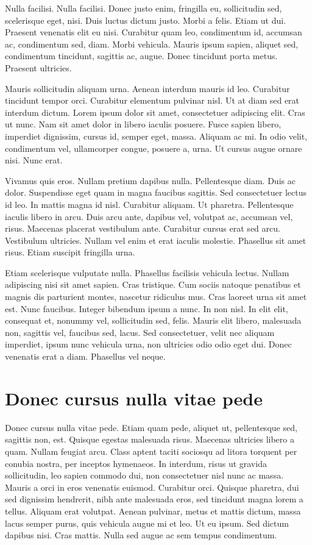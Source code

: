 \documentclass[printmode,mgr,pl]{mgr}
\begin{document}
Nulla facilisi. Nulla facilisi. Donec justo enim, fringilla eu,
sollicitudin sed, scelerisque eget, nisi. Duis luctus dictum
justo. Morbi a felis. Etiam ut dui. Praesent venenatis elit eu
nisi. Curabitur quam leo, condimentum id, accumsan ac, condimentum
sed, diam. Morbi vehicula. Mauris ipsum sapien, aliquet sed,
condimentum tincidunt, sagittis ac, augue. Donec tincidunt porta
metus. Praesent ultricies.

Mauris sollicitudin aliquam urna. Aenean interdum mauris id
leo. Curabitur tincidunt tempor orci. Curabitur elementum pulvinar
nisl. Ut at diam sed erat interdum dictum. Lorem ipsum dolor sit amet,
consectetuer adipiscing elit. Cras ut nunc. Nam sit amet dolor in
libero iaculis posuere. Fusce sapien libero, imperdiet dignissim,
cursus id, semper eget, massa. Aliquam ac mi. In odio velit,
condimentum vel, ullamcorper congue, posuere a, urna. Ut cursus augue
ornare nisi. Nunc erat.

Vivamus quis eros. Nullam pretium dapibus nulla. Pellentesque
diam. Duis ac dolor. Suspendisse eget quam in magna faucibus
sagittis. Sed consectetuer lectus id leo. In mattis magna id
nisl. Curabitur aliquam. Ut pharetra. Pellentesque iaculis libero in
arcu. Duis arcu ante, dapibus vel, volutpat ac, accumsan vel,
risus. Maecenas placerat vestibulum ante. Curabitur cursus erat sed
arcu. Vestibulum ultricies. Nullam vel enim et erat iaculis
molestie. Phasellus sit amet risus. Etiam suscipit fringilla urna.

Etiam scelerisque vulputate nulla. Phasellus facilisis vehicula
lectus. Nullam adipiscing nisi sit amet sapien. Cras tristique. Cum
sociis natoque penatibus et magnis dis parturient montes, nascetur
ridiculus mus. Cras laoreet urna sit amet est. Nunc faucibus. Integer
bibendum ipsum a nunc. In non nisl. In elit elit, consequat et,
nonummy vel, sollicitudin sed, felis. Mauris elit libero, malesuada
non, sagittis vel, faucibus sed, lacus. Sed consectetuer, velit nec
aliquam imperdiet, ipsum nunc vehicula urna, non ultricies odio odio
eget dui. Donec venenatis erat a diam. Phasellus vel neque.

\appendix
\chapter{Donec cursus nulla vitae pede}
Donec cursus nulla vitae pede. Etiam quam pede, aliquet ut,
pellentesque sed, sagittis non, est. Quisque egestas malesuada
risus. Maecenas ultricies libero a quam. Nullam feugiat arcu. Class
aptent taciti sociosqu ad litora torquent per conubia nostra, per
inceptos hymenaeos. In interdum, risus ut gravida sollicitudin, leo
sapien commodo dui, non consectetuer nisl nunc ac massa. Mauris a orci
in eros venenatis euismod. Curabitur orci. Quisque pharetra, dui sed
dignissim hendrerit, nibh ante malesuada eros, sed tincidunt magna
lorem a tellus. Aliquam erat volutpat. Aenean pulvinar, metus et
mattis dictum, massa lacus semper purus, quis vehicula augue mi et
leo. Ut eu ipsum. Sed dictum dapibus nisi. Cras mattis. Nulla sed
augue ac sem tempus condimentum.
\end{document}
